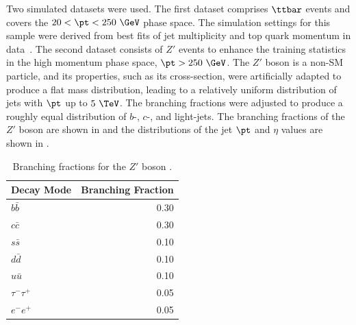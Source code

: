Two simulated datasets were used.
The first dataset comprises $\ttbar$ events and covers the $20 < \pt < 250~\GeV$ phase space.
The simulation settings for this sample were derived from best fits of jet multiplicity and top quark momentum in data~\cite{ttbar1, ttbar2}.
The second dataset consists of $Z'$ events to enhance the training statistics in the high momentum phase space, $\pt > 250~\GeV$.
The $Z'$ boson is a non-SM particle, and its properties, such as its cross-section, were artificially adapted to produce a flat mass distribution, leading to a relatively uniform distribution of jets with $\pt$ up to $5~\TeV$.
The branching fractions were adjusted to produce a roughly equal distribution of $b$-, $c$-, and light-jets.
The branching fractions of the $Z'$ boson are shown in  and the distributions of the jet $\pt$ and $\eta$ values are shown in .

\begin{table}[ht]
    \centering
    \begin{tabular}{lr}
        \toprule
        Decay Mode & Branching Fraction \\
        \midrule
        $b\bar{b}$ & 0.30 \\
        $c\bar{c}$ & 0.30 \\
        $s\bar{s}$ & 0.10 \\
        $d\bar{d}$ & 0.10 \\
        $u\bar{u}$ & 0.10 \\
        $\tau^-\tau^+$ & 0.05 \\
        $e^-e^+$ & 0.05 \\
        \bottomrule
    \end{tabular}
    \caption{Branching fractions for the $Z'$ boson \cite{Run2FTAlgs}.}
    \label{tab:zprime_branching}
\end{table}

